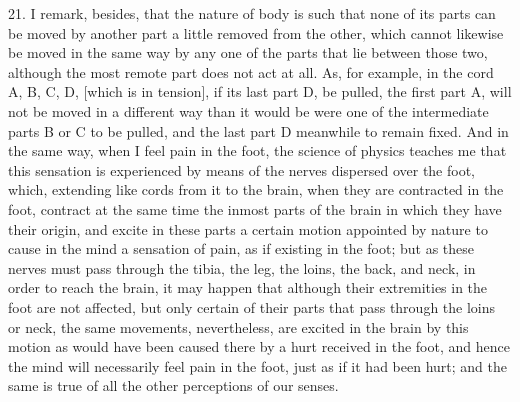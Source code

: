 21. I remark, besides, that the nature of body is such that none of its parts can be moved by another part a little removed from the other, which cannot likewise be moved in the same way by any one of the parts that lie between those two, although the most remote part does not act at all. As, for example, in the cord A, B, C, D, [which is in tension], if its last part D, be pulled, the first part A, will not be moved in a different way than it would be were one of the intermediate parts B or C to be pulled, and the last part D meanwhile to remain fixed. And in the same way, when I feel pain in the foot, the science of physics teaches me that this sensation is experienced by means of the nerves dispersed over the foot, which, extending like cords from it to the brain, when they are contracted in the foot, contract at the same time the inmost parts of the brain in which they have their origin, and excite in these parts a certain motion appointed by nature to cause in the mind a sensation of pain, as if existing in the foot; but as these nerves must pass through the tibia, the leg, the loins, the back, and neck, in order to reach the brain, it may happen that although their extremities in the foot are not affected, but only certain of their parts that pass through the loins or neck, the same movements, nevertheless, are excited in the brain by this motion as would have been caused there by a hurt received in the foot, and hence the mind will necessarily feel pain in the foot, just as if it had been hurt; and the same is true of all the other perceptions of our senses.

